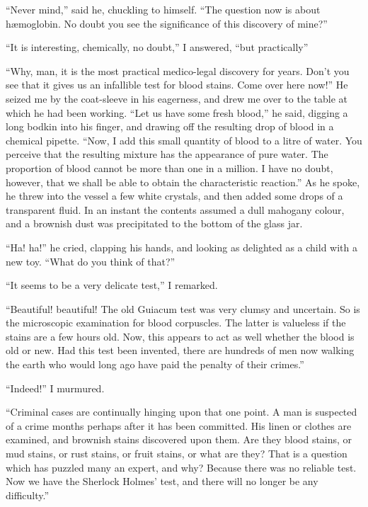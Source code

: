 \documentclass[12pt,english]{book}
\begin{document}
{}``Never mind,'' said he, chuckling to himself. {}``The question
now is about h\ae moglobin. No doubt you see the significance of
this discovery of mine?''

{}``It is interesting, chemically, no doubt,'' I answered, {}``but
practically\mdsh{---}''

{}``Why, man, it is the most practical medico-legal discovery for
years. Don't you see that it gives us an infallible test for blood
stains. Come over here now!'' He seized me by the coat-sleeve in
his eagerness, and drew me over to the table at which he had been
working. {}``Let us have some fresh blood,'' he said, digging a
long bodkin into his finger, and drawing off the resulting drop of
blood in a chemical pipette. {}``Now, I add this small quantity of
blood to a litre of water. You perceive that the resulting mixture
has the appearance of pure water. The proportion of blood cannot be
more than one in a million. I have no doubt, however, that we shall
be able to obtain the characteristic reaction.'' As he spoke, he
threw into the vessel a few white crystals, and then added some drops
of a transparent fluid. In an instant the contents assumed a dull
mahogany colour, and a brownish dust was precipitated to the bottom
of the glass jar.

{}``Ha! ha!'' he cried, clapping his hands, and looking as delighted
as a child with a new toy. {}``What do you think of that?''

{}``It seems to be a very delicate test,'' I remarked.

{}``Beautiful! beautiful! The old Guiacum test was very clumsy and
uncertain. So is the microscopic examination for blood corpuscles.
The latter is valueless if the stains are a few hours old. Now, this
appears to act as well whether the blood is old or new. Had this test
been invented, there are hundreds of men now walking the earth who
would long ago have paid the penalty of their crimes.''

{}``Indeed!'' I murmured.

{}``Criminal cases are continually hinging upon that one point. A
man is suspected of a crime months perhaps after it has been committed.
His linen or clothes are examined, and brownish stains discovered
upon them. Are they blood stains, or mud stains, or rust stains, or
fruit stains, or what are they? That is a question which has puzzled
many an expert, and why? Because there was no reliable test. Now we
have the Sherlock Holmes' test, and there will no longer be any difficulty.''
\end{document}
